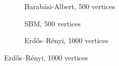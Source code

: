 \begin{figure}
\begin{subfigure}{0.3\columnwidth}
    \caption{Barabási-Albert, 500 vertices}%
    \label{snr_BA}%
    \end{subfigure}
    \hfill%
    \begin{subfigure}{0.3\columnwidth}
    \caption{SBM, 500 vertices}%
    \label{snr_SBM}%
    \end{subfigure}%
    \hfill
    \begin{subfigure}{0.3\columnwidth}
    \caption{Erdős–Rényi, 1000 vertices} 
    \label{snr_ER_1000}

\end{subfigure}
\end{figure}
